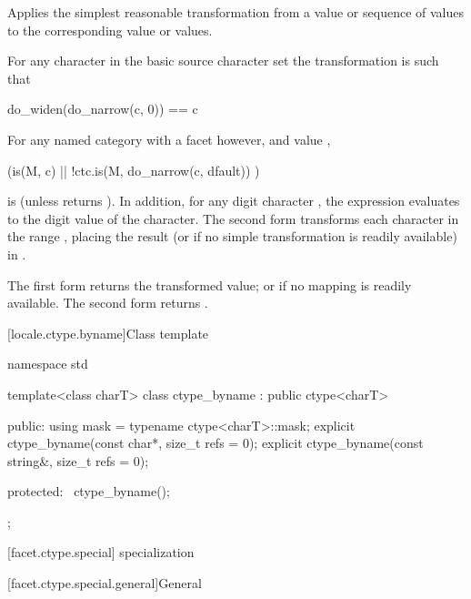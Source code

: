 \begin{itemdescr}
\pnum
\effects
Applies the simplest reasonable transformation
from a  value or sequence of  values
to the corresponding  value or values.

For any character  in the basic source character set
the transformation is such that
\begin{codeblock}
do_widen(do_narrow(c, 0)) == c
\end{codeblock}

For any named  category with
a  facet  however, and
 value ,
\begin{codeblock}
(is(M, c) || !ctc.is(M, do_narrow(c, dfault)) )
\end{codeblock}
is  (unless  returns ).
In addition, for any digit character ,
the expression 
evaluates to the digit value of the character.
The second form transforms
each character  in the range ,
placing the result
(or  if no simple transformation is readily available)
in .

\pnum
\returns
The first form returns the transformed value;
or  if no mapping is readily available.
The second form returns .
\end{itemdescr}

[locale.ctype.byname]{Class template }

%
\begin{codeblock}
namespace std {
  template<class charT>
    class ctype_byname : public ctype<charT> {
    public:
      using mask = typename ctype<charT>::mask;
      explicit ctype_byname(const char*, size_t refs = 0);
      explicit ctype_byname(const string&, size_t refs = 0);

    protected:
      ~ctype_byname();
    };
}
\end{codeblock}

[facet.ctype.special]{ specialization}

[facet.ctype.special.general]{General}

